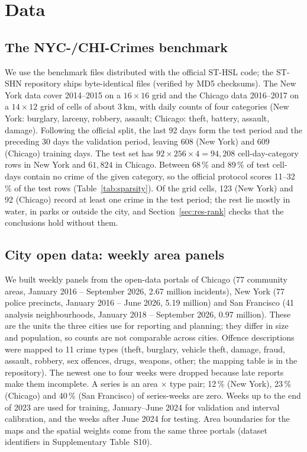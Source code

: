 \documentclass[preprint,12pt,authoryear]{elsarticle}
\begin{document}
\section{Data}\label{sec:data}

\subsection{The NYC-/CHI-Crimes benchmark}
We use the benchmark files distributed with the official ST-HSL code; the ST-SHN repository ships byte-identical files (verified by MD5 checksums). The New York data cover 2014--2015 on a $16\times16$ grid and the Chicago data 2016--2017 on a $14\times12$ grid of cells of about 3\,km, with daily counts of four categories (New York: burglary, larceny, robbery, assault; Chicago: theft, battery, assault, damage). Following the official split, the last 92 days form the test period and the preceding 30 days the validation period, leaving 608 (New York) and 609 (Chicago) training days. The test set has $92\times256\times4=94{,}208$ cell-day-category rows in New York and $61{,}824$ in Chicago. Between 68\,\% and 89\,\% of test cell-days contain no crime of the given category, so the official protocol scores 11--32\,\% of the test rows (Table~\ref{tab:sparsity}). Of the grid cells, 123 (New York) and 92 (Chicago) record at least one crime in the test period; the rest lie mostly in water, in parks or outside the city, and Section~\ref{sec:res-rank} checks that the conclusions hold without them.



\subsection{City open data: weekly area panels}
We built weekly panels from the open-data portals of Chicago (77 community areas, January 2016 -- September 2026, 2.67 million incidents), New York (77 police precincts, January 2016 -- June 2026, 5.19 million) and San Francisco (41 analysis neighbourhoods, January 2018 -- September 2026, 0.97 million). These are the units the three cities use for reporting and planning; they differ in size and population, so counts are not comparable across cities. Offence descriptions were mapped to 11 crime types (theft, burglary, vehicle theft, damage, fraud, assault, robbery, sex offences, drugs, weapons, other; the mapping table is in the repository). The newest one to four weeks were dropped because late reports make them incomplete. A series is an area $\times$ type pair; 12\,\% (New York), 23\,\% (Chicago) and 40\,\% (San Francisco) of series-weeks are zero. Weeks up to the end of 2023 are used for training, January--June 2024 for validation and interval calibration, and the weeks after June 2024 for testing. Area boundaries for the maps and the spatial weights come from the same three portals (dataset identifiers in Supplementary Table~S10).
\end{document}
